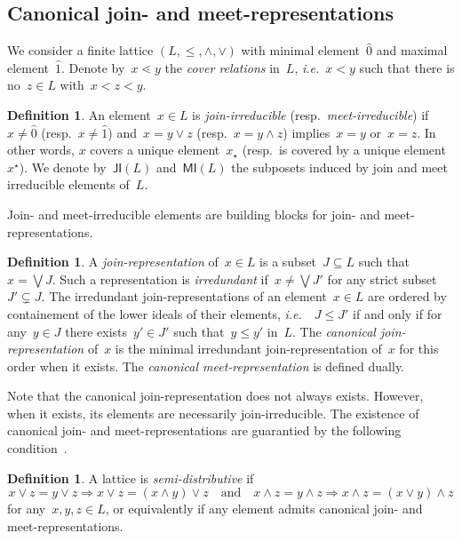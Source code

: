\documentclass{memo-l}
\theoremstyle{definition}
\newtheorem{definition}[theorem]{Definition}
\newcommand{\ie}{\textit{i.e.}~} %
\newcommand{\darkblue}{\color{darkblue}} %
\newcommand{\defn}[1]{\textsl{\darkblue #1}} %
\newcommand{\meet}{\wedge} %
\newcommand{\join}{\vee} %
\newcommand{\bigJoin}{\bigvee} %
\newcommand{\JI}{\mathsf{JI}} %
\newcommand{\MI}{\mathsf{MI}} %
\begin{document}
\subsection{Canonical join- and meet-representations}
\label{subsec:joinIrreducibleRep}

We consider a finite lattice $(L,\le,\meet,\join)$ with minimal element~$\hat 0$ and maximal element~$\hat 1$.
Denote by~$x \lessdot y$ the \defn{cover relations} in~$L$, \ie $x < y$ such that there is no~$z \in L$ with~$x < z < y$.

\begin{definition}
An element~$x \in L$ is \defn{join-irreducible} (resp.~\defn{meet-irreducible}) if~$x \ne \hat 0$ (resp.~$x \ne \hat 1$) and~$x = y \join z$ (resp.~$x = y \meet z$) implies~$x = y$ or~$x = z$.
In other words, $x$ covers a unique element~$x_\star$ (resp.~is covered by a unique element~$x^\star$).
We denote by~$\JI(L)$ and~$\MI(L)$ the subposets induced by join and meet irreducible elements of~$L$.
\end{definition}

Join- and meet-irreducible elements are building blocks for join- and meet-representations.

\begin{definition}
A \defn{join-representation} of~$x \in L$ is a subset~$J \subseteq L$ such that~${x = \bigJoin J}$.
Such a representation is \defn{irredundant} if~$x \ne \bigJoin J'$ for any strict subset~$J' \subsetneq J$.
The irredundant join-representations of an element~$x \in L$ are ordered by containement of the lower ideals of their elements, \ie~$J \le J'$ if and only if for any~$y \in J$ there exists~$y' \in J'$ such that~$y \le y'$ in~$L$.
The \defn{canonical join-representation} of~$x$ is the minimal irredundant join-representation of~$x$ for this order when it exists.
The \defn{canonical meet-representation} is defined dually.
\end{definition}

Note that the canonical join-representation does not always exists.
However, when it exists, its elements are necessarily join-irreducible.
The existence of canonical join- and meet-representations are guarantied by the following condition~\cite[Thm.~2.24]{FreeseNation}.

\begin{definition}
A lattice is \defn{semi-distributive} if
\[
x \join z = y \join z \Longrightarrow x \join z = (x \meet y) \join z
\quad\text{and}\quad
x \meet z = y \meet z \Longrightarrow x \meet z = (x \join y) \meet z
\]
for any~$x, y, z \in L$, or equivalently if any element admits canonical join- and meet-representations.
\end{definition}
\end{document}
